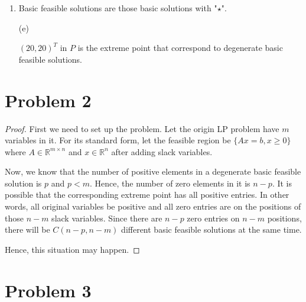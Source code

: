 \documentclass[12pt]{article}
\begin{document}
\begin{enumerate}[label = (\alph*)]
\item
Basic feasible solutions are those basic solutions with "$\star$".


\item [(e)]

$(20, 20)^T$ in $P$ is the extreme point that correspond to degenerate basic feasible solutions.



\end{enumerate}


\section*{Problem 2}

\begin{proof}

First we need to set up the problem. Let the origin LP problem have $m$ variables in it. For its standard form, let the feasible region be $\{Ax = b,  x\geqslant 0\}$ where $A\in\mathbb{R}^{m\times n}$ and $x\in \mathbb R^n$ after adding slack variables.

Now, we know that the number of positive elements in a degenerate basic feasible solution is $p$ and $p < m$. Hence, the number of zero elements in it is $n-p$. It is possible that the corresponding extreme point has all positive entries. In other words, all original variables be positive and all zero entries are on the positions of those $n-m$ slack variables. Since there are $n-p$ zero entries on $n-m$ positions, there will be $C(n-p, n-m)$ different basic feasible solutions at the same time.

Hence, this situation may happen.

\end{proof}




\section*{Problem 3}
\end{document}

